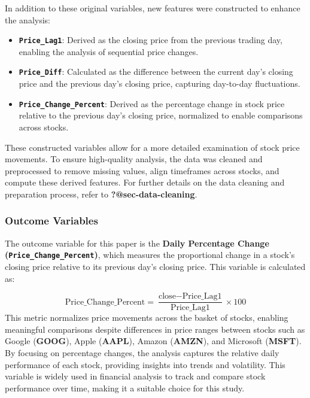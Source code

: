 \documentclass[
  letterpaper,
  DIV=11,
  numbers=noendperiod]{scrartcl}
\providecommand{\tightlist}{%
  \setlength{\itemsep}{0pt}\setlength{\parskip}{0pt}}\usepackage{longtable,booktabs,array}
\begin{document}
In addition to these original variables, new features were constructed
to enhance the analysis:

\begin{itemize}
\tightlist
\item
  \textbf{\texttt{Price\_Lag1}}: Derived as the closing price from the
  previous trading day, enabling the analysis of sequential price
  changes.
\item
  \textbf{\texttt{Price\_Diff}}: Calculated as the difference between
  the current day's closing price and the previous day's closing price,
  capturing day-to-day fluctuations.
\item
  \textbf{\texttt{Price\_Change\_Percent}}: Derived as the percentage
  change in stock price relative to the previous day's closing price,
  normalized to enable comparisons across stocks.
\end{itemize}

These constructed variables allow for a more detailed examination of
stock price movements. To ensure high-quality analysis, the data was
cleaned and preprocessed to remove missing values, align timeframes
across stocks, and compute these derived features. For further details
on the data cleaning and preparation process, refer to
\textbf{?@sec-data-cleaning}.

\subsubsection{Outcome Variables}\label{outcome-variables}

The outcome variable for this paper is the \textbf{Daily Percentage
Change (\texttt{Price\_Change\_Percent})}, which measures the
proportional change in a stock's closing price relative to its previous
day's closing price. This variable is calculated as:

\[
\text{Price_Change_Percent} = \frac{\text{close} - \text{Price_Lag1}}{\text{Price_Lag1}} \times 100
\] This metric normalizes price movements across the basket of stocks,
enabling meaningful comparisons despite differences in price ranges
between stocks such as Google (\textbf{GOOG}), Apple (\textbf{AAPL}),
Amazon (\textbf{AMZN}), and Microsoft (\textbf{MSFT}). By focusing on
percentage changes, the analysis captures the relative daily performance
of each stock, providing insights into trends and volatility. This
variable is widely used in financial analysis to track and compare stock
performance over time, making it a suitable choice for this study.
\end{document}
